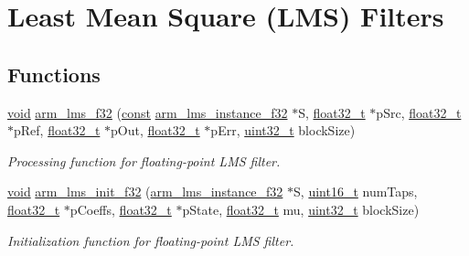 \hypertarget{group___l_m_s}{\section{Least Mean Square (L\-M\-S) Filters}
\label{group___l_m_s}
}
\subsection*{Functions}
\begin{DoxyCompactItemize}
\item 
\hyperlink{group___n_a_m_e_ga18028b8badbf1ea7e704ccac3c488e82}{void} \hyperlink{group___l_m_s_gae266d009e682180421601627c79a3843}{arm\-\_\-lms\-\_\-f32} (\hyperlink{group___n_a_m_e_ga7ae6d0e43244213b34de2c2b9aa30da6}{const} \hyperlink{structarm__lms__instance__f32}{arm\-\_\-lms\-\_\-instance\-\_\-f32} $\ast$S, \hyperlink{arm__math_8h_a4611b605e45ab401f02cab15c5e38715}{float32\-\_\-t} $\ast$p\-Src, \hyperlink{arm__math_8h_a4611b605e45ab401f02cab15c5e38715}{float32\-\_\-t} $\ast$p\-Ref, \hyperlink{arm__math_8h_a4611b605e45ab401f02cab15c5e38715}{float32\-\_\-t} $\ast$p\-Out, \hyperlink{arm__math_8h_a4611b605e45ab401f02cab15c5e38715}{float32\-\_\-t} $\ast$p\-Err, \hyperlink{stdint_8h_a435d1572bf3f880d55459d9805097f62}{uint32\-\_\-t} block\-Size)
\begin{DoxyCompactList}\small\item\em Processing function for floating-\/point L\-M\-S filter. \end{DoxyCompactList}\item 
\hyperlink{group___n_a_m_e_ga18028b8badbf1ea7e704ccac3c488e82}{void} \hyperlink{group___l_m_s_ga9fc7adca0966ff2cec1746fca8364cee}{arm\-\_\-lms\-\_\-init\-\_\-f32} (\hyperlink{structarm__lms__instance__f32}{arm\-\_\-lms\-\_\-instance\-\_\-f32} $\ast$S, \hyperlink{stdint_8h_a273cf69d639a59973b6019625df33e30}{uint16\-\_\-t} num\-Taps, \hyperlink{arm__math_8h_a4611b605e45ab401f02cab15c5e38715}{float32\-\_\-t} $\ast$p\-Coeffs, \hyperlink{arm__math_8h_a4611b605e45ab401f02cab15c5e38715}{float32\-\_\-t} $\ast$p\-State, \hyperlink{arm__math_8h_a4611b605e45ab401f02cab15c5e38715}{float32\-\_\-t} mu, \hyperlink{stdint_8h_a435d1572bf3f880d55459d9805097f62}{uint32\-\_\-t} block\-Size)
\begin{DoxyCompactList}\small\item\em Initialization function for floating-\/point L\-M\-S filter. \end{DoxyCompactList}\item 

\end{DoxyCompactItemize}
